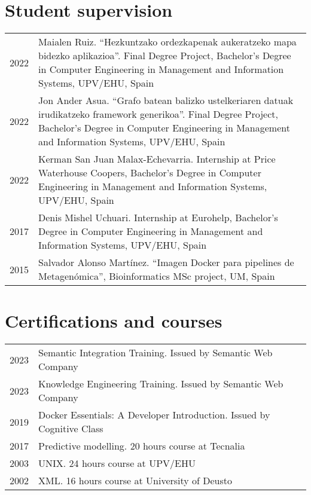 \documentclass[11pt,fullpage]{article}
\begin{document}
\section*{Student supervision}

\begin{longtable}{p{0.5in}|p{5.5in}}

2022 & Maialen Ruiz. ``Hezkuntzako ordezkapenak aukeratzeko mapa bidezko aplikazioa''. Final Degree Project, Bachelor's Degree in Computer Engineering in Management and Information Systems, UPV/EHU, Spain \\
2022 & Jon Ander Asua. ``Grafo batean balizko ustelkeriaren datuak irudikatzeko framework generikoa''. Final Degree Project, Bachelor's Degree in Computer Engineering in Management and Information Systems, UPV/EHU, Spain \\
2022 & Kerman San Juan Malax-Echevarria. Internship at Price Waterhouse Coopers, Bachelor's Degree in Computer Engineering in Management and Information Systems, UPV/EHU, Spain  \\
2017 & Denis Mishel Uchuari. Internship at Eurohelp, Bachelor's Degree in Computer Engineering in Management and Information Systems, UPV/EHU, Spain \\
2015 & Salvador Alonso Mart\'inez. ``Imagen Docker para pipelines de Metagen\'omica'', Bioinformatics MSc project, UM, Spain \\

\end{longtable}

\section*{Certifications and courses}

\begin{longtable}{p{0.5in}|p{5.5in}}
  2023 & Semantic Integration Training. Issued by Semantic Web Company \\ %
  2023 & Knowledge Engineering Training. Issued by Semantic Web Company \\ %
  2019 & Docker Essentials: A Developer Introduction. Issued by Cognitive Class \\ %
  2017 & Predictive modelling. 20 hours course at Tecnalia \\
  2003 & UNIX. 24 hours course at UPV/EHU \\
  2002 & XML. 16 hours course at University of Deusto \\
  
\end{longtable}
\end{document}
